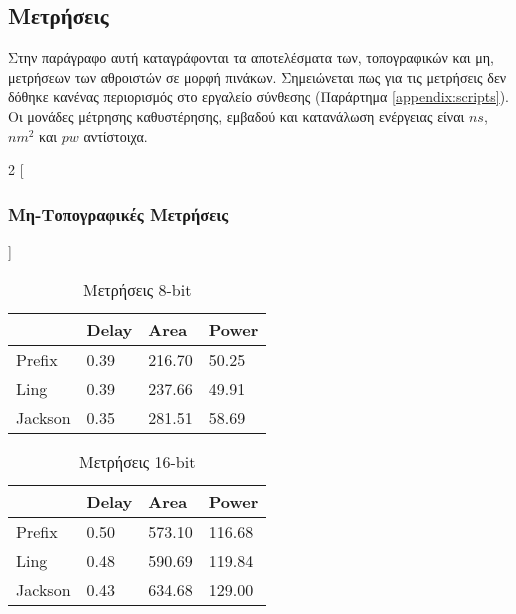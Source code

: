 \clearpage
\subsection{Μετρήσεις}
Στην παράγραφο αυτή καταγράφονται τα αποτελέσματα των, τοπογραφικών και μη, μετρήσεων των αθροιστών σε μορφή πινάκων. Σημειώνεται πως για τις μετρήσεις δεν δόθηκε κανένας περιορισμός στο εργαλείο σύνθεσης (Παράρτημα \ref{appendix:scripts}). Οι μονάδες μέτρησης καθυστέρησης, εμβαδού και κατανάλωση ενέργειας είναι $ns$, $nm^2$ και $pw$ αντίστοιχα.
\begin{multicols}{2}
[\subsubsection{Μη-Τοπογραφικές Μετρήσεις}]
\begin{table}[H]
\centering
     \begin{tabular}{||p{1.2cm} | p{0.7cm}  p{1cm}  p{1cm} ||} 
        \hline
         & Delay & Area & Power \\ [0.5ex] 
        \hline\hline
        Prefix  & 0.39  & 216.70    & 50.25 \\ 
        \hline
        Ling    & 0.39  & 237.66    & 49.91 \\
        \hline
        Jackson & 0.35  & 281.51    & 58.69 \\
        \hline
    \end{tabular}
\caption{Μετρήσεις 8-bit}
\label{result_table_8}
\end{table}
\begin{table}[H]
\centering
     \begin{tabular}{||p{1.2cm} | p{0.7cm} p{1cm} p{1cm} ||} 
        \hline
        & Delay & Area & Power \\ [0.5ex] 
        \hline\hline
        Prefix  & 0.50  & 573.10    & 116.68 \\ 
        \hline
        Ling    & 0.48  & 590.69    & 119.84 \\
        \hline
        Jackson & 0.43  & 634.68    & 129.00 \\
        \hline
    \end{tabular}
\caption{Μετρήσεις 16-bit}
\label{result_table_16}
\end{table}
\begin{table}[H]

\end{table}
\end{multicols}
